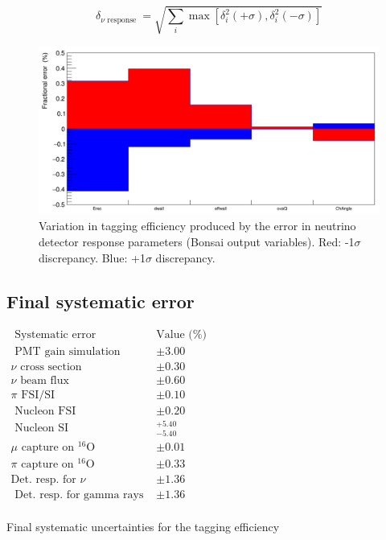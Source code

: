 \begin{equation}
    \delta_{\text {$\nu$ response }}=\sqrt{\sum_i \max \left[\delta_i^2(+\sigma), \delta_i^2(-\sigma)\right]}
\label{eq:total_nu_det_syst}
\end{equation}

\begin{figure}[!htb]
    \centering
    \includegraphics[width=\textwidth]{Figures/nu_det_response.png}
    \caption{Variation in tagging efficiency produced by the error in neutrino detector response parameters (Bonsai output variables). Red: -1$\sigma$ discrepancy. Blue: +1$\sigma$ discrepancy. }
    \label{fig:nu_det_syst_error}
\end{figure}

\newpage


\subsection{Final systematic error}

\begin{table}[htb!]
\centering
    $\begin{array}{lll}
    \hline \text { Systematic error} & \text{Value (\%)} \\
    \hline 
    \text { PMT gain simulation } & \pm 3.00 \\ 
    \nu \text { cross section } & \pm 0.30 \\ 
    \nu \text { beam flux } & \pm 0.60 \\ 
    \pi \text { FSI/SI } & \pm 0.10  \\ 
    \text { Nucleon FSI } & \pm 0.20  \\ 
    \text { Nucleon SI } & { }_{-5.40}^{+5.40} \\ 
    \mu \text { capture on }{ }^{16} \mathrm{O} & \pm 0.01\\ 
    \pi \text { capture on }{ }^{16} \mathrm{O} & \pm 0.33\\
    \text{Det. resp. for $\nu$} & \pm 1.36\\
    \text { Det. resp. for gamma rays }& \pm 1.36 \\ 
    \end{array}$
\caption{Final systematic uncertainties for the tagging efficiency} 
\label{table:systuncertaintytable}
\end{table}



